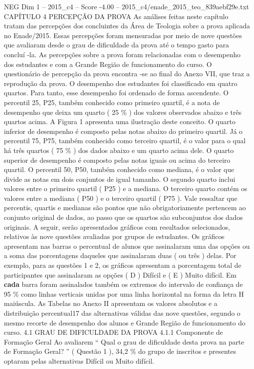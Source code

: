 \begin{textsample}{NEG Dim 1 – 2015\_c4 – Score -4.00 – 2015\_c4/enade\_2015\_teo\_839aebf29e.txt}  \label{ex:f1_neg_103}
CAPÍTULO 4 PERCEPÇÃO DA PROVA As análises feitas neste capítulo tratam das percepções dos concluintes da Área de Teologia sobre a prova aplicada no Enade/2015.
Essas percepções foram mensuradas por meio de nove questões que avaliaram desde o grau de dificuldade da prova até o tempo gasto para concluí -la.
As percepções sobre a prova foram relacionadas com o desempenho dos estudantes e com a Grande Região de funcionamento do curso.
O questionário de percepção da prova encontra -se ao final do Anexo VII, que traz a reprodução da prova.
O desempenho dos estudantes foi classificado em quatro quartos.
Para tanto, esse desempenho foi ordenado de forma ascendente.
O percentil 25, P25, também conhecido como primeiro quartil, é a nota de desempenho que deixa um quarto ( 25 \% ) dos valores observados abaixo e três quartos acima.
A Figura 1 apresenta uma ilustração deste conceito.
O quarto inferior de desempenho é composto pelas notas abaixo do primeiro quartil.
Já o percentil 75, P75, também conhecido como terceiro quartil, é o valor para o qual há três quartos ( 75 \% ) dos dados abaixo e um quarto acima dele.
O quarto superior de desempenho é composto pelas notas iguais ou acima do terceiro quartil.
O percentil 50, P50, também conhecido como mediana, é o valor que divide as notas em dois conjuntos de igual tamanho.
O segundo quarto inclui valores entre o primeiro quartil ( P25 ) e a mediana.
O terceiro quarto contém os valores entre a mediana ( P50 ) e o terceiro quartil ( P75 ).
Vale ressaltar que percentis, quartis e medianas são pontos que não obrigatoriamente pertencem ao conjunto original de dados, ao passo que os quartos são subconjuntos dos dados originais.
A seguir, serão apresentados gráficos com resultados selecionados, relativos às nove questões avaliadas por grupos de estudantes.
Os gráficos apresentam nas barras o percentual de alunos que assinalaram uma das opções ou a soma das porcentagens daqueles que assinalaram duas ( ou três ) delas.
Por exemplo, para as questões 1 e 2, os gráficos apresentam a porcentagem total de participantes que assinalaram as opções ( D ) Difícil e ( E ) Muito difícil.
Em \textbf{cada} barra foram assinalados também os extremos do intervalo de confiança de 95 \% como linhas verticais unidas por uma linha horizontal na forma da letra H maiúscula.
As Tabelas no Anexo II apresentam os valores absolutos e a distribuição percentual17 das alternativas válidas das nove questões, segundo o mesmo recorte de desempenho dos alunos e Grande Região de funcionamento do curso. 4.1 GRAU DE DIFICULDADE DA PROVA 4.1.1 Componente de Formação Geral Ao avaliarem “ Qual o grau de dificuldade desta prova na parte de Formação Geral? ” ( Questão 1 ), 34,2 \% do grupo de inscritos e presentes optaram pelas alternativas Difícil ou Muito difícil.

\end{textsample}
